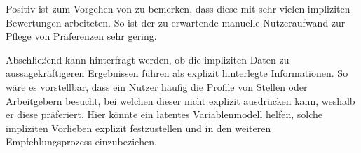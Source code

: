 Positiv ist zum Vorgehen von \textcite[S. 1ff.]{lu:2013} zu bemerken, dass diese mit sehr vielen impliziten Bewertungen arbeiteten. So ist der zu erwartende manuelle Nutzeraufwand zur Pflege von Präferenzen sehr gering.

Abschließend kann hinterfragt werden, ob die impliziten Daten zu aussagekräftigeren Ergebnissen führen als explizit hinterlegte Informationen. So wäre es vorstellbar, dass ein Nutzer häufig die Profile von Stellen oder Arbeitgebern besucht, bei welchen dieser nicht explizit ausdrücken kann, weshalb er diese präferiert. Hier könnte ein latentes Variablenmodell helfen, solche impliziten Vorlieben explizit festzustellen und in den weiteren Empfehlungsprozess einzubeziehen.
